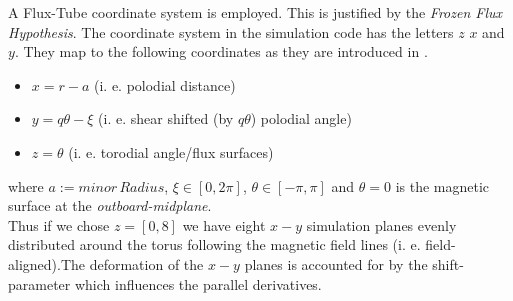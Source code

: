 \documentclass[master.tex]{subfiles}
\begin{document}
A Flux-Tube coordinate system is employed. This is justified by the \textit{Frozen Flux Hypothesis}. 
The coordinate system in the simulation code has the letters $z$ $x$ and $y$. They map to the following coordinates as they are introduced in \cite{doi:10.1063/1.1335832}.
\begin{itemize}
    \item $x = r - a$   (i. e. polodial distance)
    \item $y = q\theta - \xi$ (i. e. shear shifted (by $q\theta$) polodial angle)
    \item $z = \theta$ (i. e. torodial angle/flux surfaces)
\end{itemize} 
where $a:=minor\, Radius$, $\xi \in [0,2\pi]$, $\theta \in [-\pi,\pi]$ and $\theta = 0$ is the magnetic surface at the \textit{outboard-midplane}.\\
Thus if we chose $z=[0,8]$ we have eight $x-y$ simulation planes evenly distributed around the torus following the magnetic field lines (i. e. field-aligned).The deformation of the $x-y$ planes is accounted for by the shift-parameter which influences the parallel derivatives.
\end{document}
